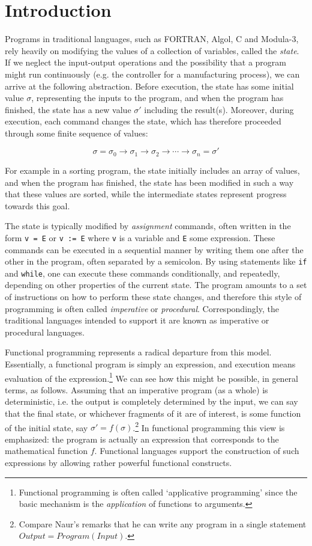 \chapter{Introduction}

Programs in traditional languages, such as FORTRAN, Algol, C and Modula-3, rely
heavily on modifying the values of a collection of variables, called the {\em
state}. If we neglect the input-output operations and the possibility that a
program might run continuously (e.g. the controller for a manufacturing
process), we can arrive at the following abstraction. Before execution, the
state has some initial value $\sigma$, representing the inputs to the program,
and when the program has finished, the state has a new value $\sigma'$
including the result(s). Moreover, during execution, each command changes the
state, which has therefore proceeded through some finite sequence of values:

$$ \sigma = \sigma_0 \to \sigma_1 \to \sigma_2 \to \cdots \to \sigma_n =
\sigma' $$

For example in a sorting program, the state initially includes an array of
values, and when the program has finished, the state has been modified in such
a way that these values are sorted, while the intermediate states represent
progress towards this goal.

The state is typically modified by {\em assignment} commands, often written in
the form {\tt v = E} or {\tt v := E} where {\tt v} is a variable and {\tt E}
some expression. These commands can be executed in a sequential manner by
writing them one after the other in the program, often separated by a
semicolon. By using statements like {\tt if} and {\tt while}, one can execute
these commands conditionally, and repeatedly, depending on other properties of
the current state. The program amounts to a set of instructions on how to
perform these state changes, and therefore this style of programming is often
called {\em imperative} or {\em procedural}. Correspondingly, the traditional
languages intended to support it are known as imperative or procedural
languages.

Functional programming represents a radical departure from this model.
Essentially, a functional program is simply an expression, and execution means
evaluation of the expression.\footnote{Functional programming is often called
`applicative programming' since the basic mechanism is the {\em application} of
functions to arguments.} We can see how this might be possible, in general
terms, as follows. Assuming that an imperative program (as a whole) is
deterministic, i.e. the output is completely determined by the input, we can
say that the final state, or whichever fragments of it are of interest, is some
function of the initial state, say $\sigma' = f(\sigma)$.\footnote{Compare
Naur's remarks \cite{raphael-spl} that he can write any program in a single
statement $Output = Program(Input)$.} In functional programming this view is
emphasized: the program is actually an expression that corresponds to the
mathematical function $f$. Functional languages support the construction of
such expressions by allowing rather powerful functional constructs.

